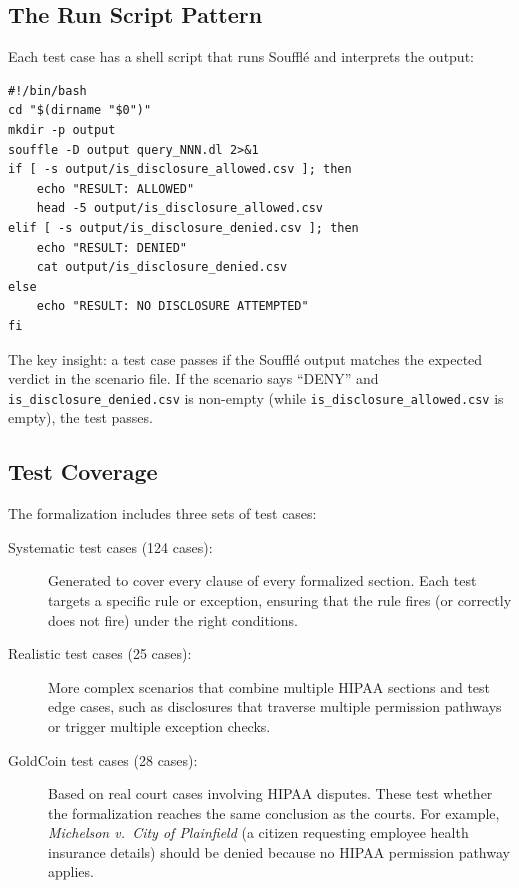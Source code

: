 \documentclass[11pt,letterpaper]{article}
\begin{document}
\subsection{The Run Script Pattern}

Each test case has a shell script that runs Souffl\'{e} and interprets the output:

\begin{lstlisting}[style=bashstyle,caption={Typical test case run script}]
#!/bin/bash
cd "$(dirname "$0")"
mkdir -p output
souffle -D output query_NNN.dl 2>&1
if [ -s output/is_disclosure_allowed.csv ]; then
    echo "RESULT: ALLOWED"
    head -5 output/is_disclosure_allowed.csv
elif [ -s output/is_disclosure_denied.csv ]; then
    echo "RESULT: DENIED"
    cat output/is_disclosure_denied.csv
else
    echo "RESULT: NO DISCLOSURE ATTEMPTED"
fi
\end{lstlisting}

The key insight: a test case passes if the Souffl\'{e} output matches the expected verdict in the scenario file. If the scenario says ``DENY'' and \texttt{is\_disclosure\_denied.csv} is non-empty (while \texttt{is\_disclosure\_allowed.csv} is empty), the test passes.

\subsection{Test Coverage}

The formalization includes three sets of test cases:

\begin{description}
  \item[Systematic test cases (124 cases):] Generated to cover every clause of every formalized section. Each test targets a specific rule or exception, ensuring that the rule fires (or correctly does not fire) under the right conditions.
  \item[Realistic test cases (25 cases):] More complex scenarios that combine multiple HIPAA sections and test edge cases, such as disclosures that traverse multiple permission pathways or trigger multiple exception checks.
  \item[GoldCoin test cases (28 cases):] Based on real court cases involving HIPAA disputes. These test whether the formalization reaches the same conclusion as the courts. For example, \emph{Michelson v.\ City of Plainfield} (a citizen requesting employee health insurance details) should be denied because no HIPAA permission pathway applies.
\end{description}
\end{document}
